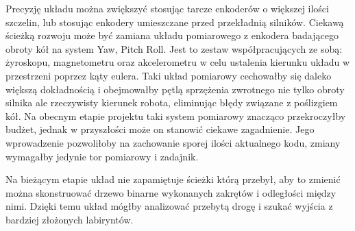 \documentclass[11pt]{article}
\begin{document}
Precyzję układu można zwiększyć stosując tarcze enkoderów o większej ilości szczelin, lub stosując enkodery umieszczane przed przekładnią silników.
Ciekawą ścieżką rozwoju może być zamiana układu pomiarowego z enkodera badającego obroty kół na system Yaw, Pitch Roll. Jest to zestaw współpracujących ze sobą: żyroskopu, magnetometru oraz akcelerometru w celu ustalenia kierunku układu w przestrzeni poprzez kąty eulera.
Taki układ pomiarowy cechowałby się daleko większą dokładnością i obejmowałby pętlą sprzężenia zwrotnego nie tylko obroty silnika ale rzeczywisty kierunek robota, eliminując błędy związane z poślizgiem kół.
Na obecnym etapie projektu taki system pomiarowy znacząco przekroczyłby budżet, jednak w przyszłości może on stanowić ciekawe zagadnienie.
Jego wprowadzenie pozwoliłoby na zachowanie sporej ilości aktualnego kodu, zmiany wymagałby jedynie tor pomiarowy i zadajnik.

Na bieżącym etapie układ nie zapamiętuje ścieżki którą przebył, aby to zmienić można skonstruować drzewo binarne wykonanych zakrętów i odległości między nimi. Dzięki temu układ mógłby analizować przebytą drogę i szukać wyjścia z bardziej złożonych labiryntów.
\end{document}
